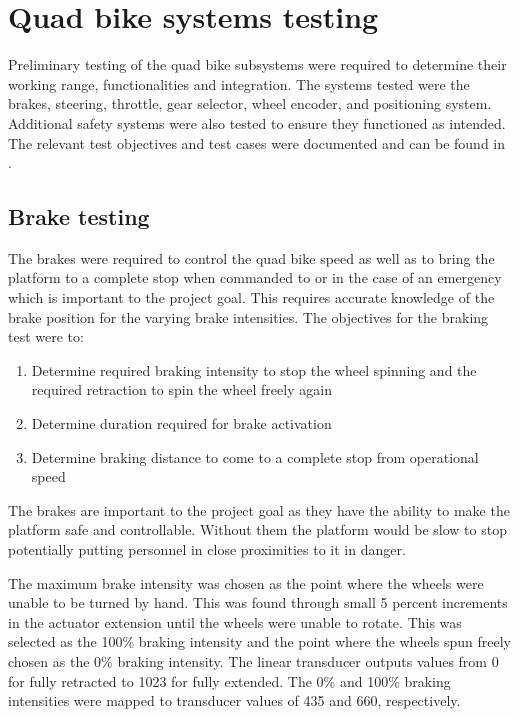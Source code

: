 \documentclass[main.tex]{subfiles}
\begin{document}
\section{Quad bike systems testing}
Preliminary testing of the quad bike subsystems were required to determine their working range, functionalities and integration. The systems tested were the brakes, steering, throttle, gear selector, wheel encoder, and positioning system. Additional safety systems were also tested to ensure they functioned as intended.
The relevant test objectives and test cases were documented and can be found in .

\subsection{Brake testing}
The brakes were required to control the quad bike speed as well as to bring the platform to a complete stop when commanded to or in the case of an emergency which is important to the project goal. This requires accurate knowledge of the brake position for the varying brake intensities. The objectives for the braking test were to:

\begin{enumerate}
\item Determine required braking intensity to stop the wheel spinning and the required retraction to spin the wheel freely again
\item Determine duration required for brake activation
\item Determine braking distance to come to a complete stop from operational speed  
\end{enumerate}

The brakes are important to the project goal as they have the ability to make the platform safe and controllable. Without them the platform would be slow to stop potentially putting personnel in close proximities to it in danger.

The maximum brake intensity was chosen as the point where the wheels were unable to be turned by hand. This was found through small 5 percent increments in the actuator extension until the wheels were unable to rotate. This was selected as the 100\% braking intensity and the point where the wheels spun freely chosen as the 0\% braking intensity. The linear transducer outputs values from 0 for fully retracted to 1023 for fully extended. The 0\% and 100\% braking intensities were mapped to transducer values of 435 and 660, respectively.
\end{document}
